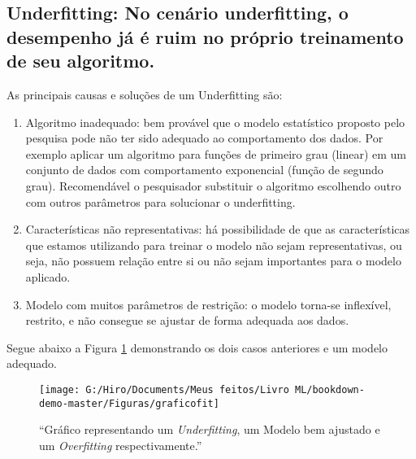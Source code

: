 \documentclass[
]{book}
\begin{document}
\hypertarget{underfitting-no-cenuxe1rio-underfitting-o-desempenho-juxe1-uxe9-ruim-no-pruxf3prio-treinamento-de-seu-algoritmo.}{%
\subsection{\texorpdfstring{\textbf{Underfitting}: No cenário underfitting, o desempenho já é ruim no próprio treinamento de seu algoritmo.}{Underfitting: No cenário underfitting, o desempenho já é ruim no próprio treinamento de seu algoritmo.}}\label{underfitting-no-cenuxe1rio-underfitting-o-desempenho-juxe1-uxe9-ruim-no-pruxf3prio-treinamento-de-seu-algoritmo.}}

As principais causas e soluções de um Underfitting são:

\begin{enumerate}
\def\labelenumi{\arabic{enumi}.}
\item
  Algoritmo inadequado: bem provável que o modelo estatístico proposto pelo pesquisa pode não ter sido adequado ao comportamento dos dados. Por exemplo aplicar um algoritmo para funções de primeiro grau (linear) em um conjunto de dados com comportamento exponencial (função de segundo grau). Recomendável o pesquisador substituir o algoritmo escolhendo outro com outros parâmetros para solucionar o underfitting.
\item
  Características não representativas: há possibilidade de que as características que estamos utilizando para treinar o modelo não sejam representativas, ou seja, não possuem relação entre si ou não sejam importantes para o modelo aplicado.
\item
  Modelo com muitos parâmetros de restrição: o modelo torna-se inflexível, restrito, e não consegue se ajustar de forma adequada aos dados.
\end{enumerate}

Segue abaixo a Figura \ref{fig:graficofit} demonstrando os dois casos anteriores e um modelo adequado.

\begin{figure}

{\centering \texttt{[image: G:/Hiro/Documents/Meus feitos/Livro ML/bookdown-demo-master/Figuras/graficofit]} 

}

\caption{``Gráfico representando um \emph{Underfitting}, um Modelo bem ajustado e um \emph{Overfitting} respectivamente.''}\label{fig:graficofit}
\end{figure}
\end{document}
